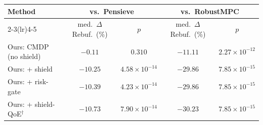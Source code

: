 \begin{tabular}{@{}lcccc@{}}
\toprule
Method & \multicolumn{2}{c}{vs.\ Pensieve} & \multicolumn{2}{c}{vs.\ RobustMPC} \\
\cmidrule(lr){2-3}\cmidrule(lr){4-5}
 & med.\ $\Delta$Rebuf.\ (\%) & $p$ & med.\ $\Delta$Rebuf.\ (\%) & $p$ \\
\midrule
Ours: CMDP (no shield) & $-0.11$ & $0.310$ & $-11.11$ & $2.27\times10^{-12}$ \\
Ours: + shield & $-10.25$ & $4.58\times10^{-14}$ & $-29.86$ & $7.85\times10^{-15}$ \\
Ours: + risk-gate & $-10.39$ & $4.23\times10^{-14}$ & $-29.86$ & $7.85\times10^{-15}$ \\
Ours: + shield-QoE$^{\dagger}$ & $-10.73$ & $7.90\times10^{-14}$ & $-30.23$ & $7.85\times10^{-15}$ \\
\bottomrule
\end{tabular}
